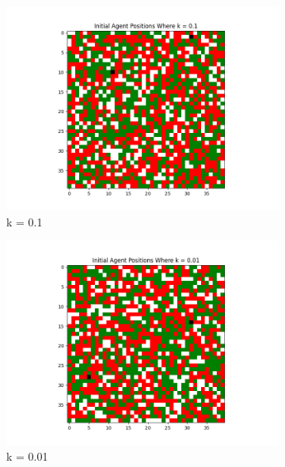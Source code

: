 \documentclass[11pt]{article}
\begin{document}
\begin{figure}[h]
		\begin{subfigure}{0.2\textwidth}
			\includegraphics[width=\linewidth]{policy3_Initial_01.png}
			\caption{\centering k = 0.1}
		\end{subfigure}\hfill
		\begin{subfigure}{0.2\textwidth}
			\includegraphics[width=\linewidth]{policy3_Initial_001.png}
			\caption{\centering k = 0.01}
		\end{subfigure}\hfill
		\begin{subfigure}{0.2\textwidth}

\end{subfigure}
\end{figure}
\end{document}
